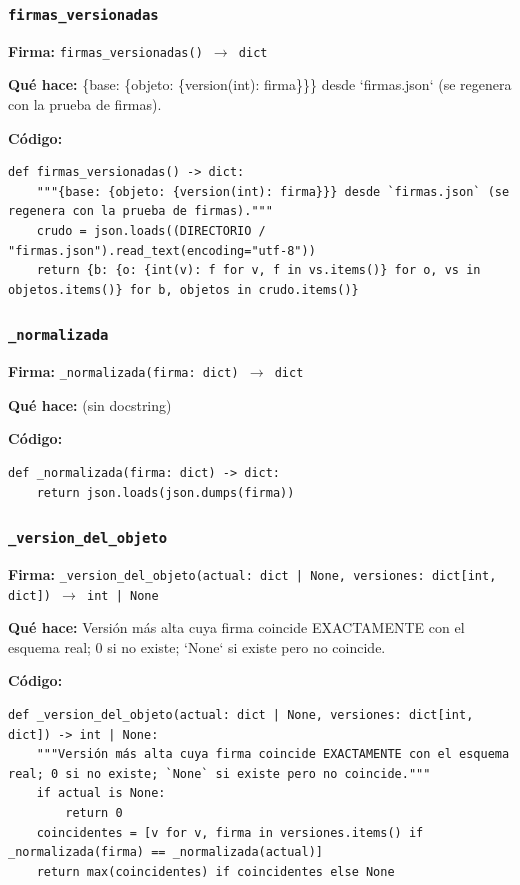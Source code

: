 \documentclass[11pt,a4paper]{article}
\begin{document}
\subsubsection*{\texttt{firmas\_versionadas}}
\textbf{Firma:} \texttt{firmas\_versionadas() $\rightarrow$ dict}

\textbf{Qué hace:} \{base: \{objeto: \{version(int): firma\}\}\} desde `firmas.json` (se regenera con la prueba de firmas).

\textbf{Código:}
\begin{lstlisting}
def firmas_versionadas() -> dict:
    """{base: {objeto: {version(int): firma}}} desde `firmas.json` (se regenera con la prueba de firmas)."""
    crudo = json.loads((DIRECTORIO / "firmas.json").read_text(encoding="utf-8"))
    return {b: {o: {int(v): f for v, f in vs.items()} for o, vs in objetos.items()} for b, objetos in crudo.items()}
\end{lstlisting}

\subsubsection*{\texttt{\_normalizada}}
\textbf{Firma:} \texttt{\_normalizada(firma: dict) $\rightarrow$ dict}

\textbf{Qué hace:} (sin docstring)

\textbf{Código:}
\begin{lstlisting}
def _normalizada(firma: dict) -> dict:
    return json.loads(json.dumps(firma))
\end{lstlisting}

\subsubsection*{\texttt{\_version\_del\_objeto}}
\textbf{Firma:} \texttt{\_version\_del\_objeto(actual: dict | None, versiones: dict[int, dict]) $\rightarrow$ int | None}

\textbf{Qué hace:} Versión más alta cuya firma coincide EXACTAMENTE con el esquema real; 0 si no existe; `None` si existe pero no coincide.

\textbf{Código:}
\begin{lstlisting}
def _version_del_objeto(actual: dict | None, versiones: dict[int, dict]) -> int | None:
    """Versión más alta cuya firma coincide EXACTAMENTE con el esquema real; 0 si no existe; `None` si existe pero no coincide."""
    if actual is None:
        return 0
    coincidentes = [v for v, firma in versiones.items() if _normalizada(firma) == _normalizada(actual)]
    return max(coincidentes) if coincidentes else None
\end{lstlisting}
\end{document}
